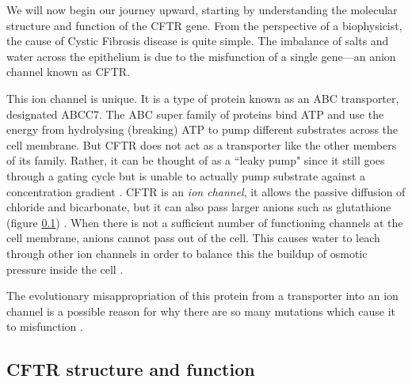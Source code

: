 We will now begin our journey upward, starting by understanding the molecular structure and function of the CFTR gene. From the perspective of a biophysicist, the cause of Cystic Fibrosis disease is quite simple. The imbalance of salts and water across the epithelium is due to the misfunction of a single gene---an anion channel known as CFTR.

This ion channel is unique. It is a type of protein known as an ABC transporter, designated ABCC7. The ABC super family of proteins bind ATP and use the energy from hydrolysing (breaking) ATP to pump different substrates across the cell membrane. But CFTR does not act as a transporter like the other members of its family. Rather, it can be thought of as a ``leaky pump" since it still goes through a gating cycle but is unable to actually pump substrate against a concentration gradient \cite{gadsby2006,linsdell2018}. CFTR is an \textit {ion channel}, it allows the passive diffusion of chloride and bicarbonate, but it can also pass larger anions such as glutathione (figure \ref{}) \cite{gadsby2006, tang2009,linsdell1998}. When there is not a sufficient number of functioning channels at the cell membrane, anions cannot pass out of the cell. This causes water to leach through other ion channels in order to balance this the buildup of osmotic pressure inside the cell \cite{verkman2003}. 

The evolutionary misappropriation of this protein from a transporter into an ion channel is a possible reason for why there are so many mutations which cause it to misfunction \cite{infield2021}.

\subsection{CFTR structure and function}

